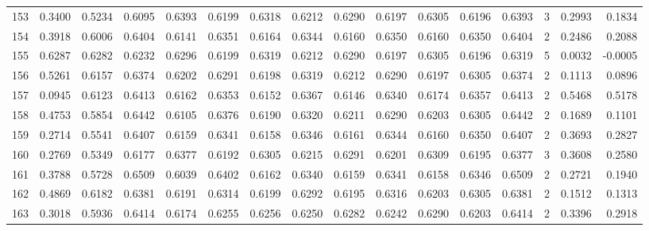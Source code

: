 \begin{tabular}{lrrrrrrrrrrrrrrr}
153 &      0.3400 &  0.5234 &  0.6095 &  0.6393 &  0.6199 &  0.6318 &  0.6212 &  0.6290 &  0.6197 &  0.6305 &   0.6196 &     0.6393 &      3 &                    0.2993 &                     0.1834 \\
154 &      0.3918 &  0.6006 &  0.6404 &  0.6141 &  0.6351 &  0.6164 &  0.6344 &  0.6160 &  0.6350 &  0.6160 &   0.6350 &     0.6404 &      2 &                    0.2486 &                     0.2088 \\
155 &      0.6287 &  0.6282 &  0.6232 &  0.6296 &  0.6199 &  0.6319 &  0.6212 &  0.6290 &  0.6197 &  0.6305 &   0.6196 &     0.6319 &      5 &                    0.0032 &                    -0.0005 \\
156 &      0.5261 &  0.6157 &  0.6374 &  0.6202 &  0.6291 &  0.6198 &  0.6319 &  0.6212 &  0.6290 &  0.6197 &   0.6305 &     0.6374 &      2 &                    0.1113 &                     0.0896 \\
157 &      0.0945 &  0.6123 &  0.6413 &  0.6162 &  0.6353 &  0.6152 &  0.6367 &  0.6146 &  0.6340 &  0.6174 &   0.6357 &     0.6413 &      2 &                    0.5468 &                     0.5178 \\
158 &      0.4753 &  0.5854 &  0.6442 &  0.6105 &  0.6376 &  0.6190 &  0.6320 &  0.6211 &  0.6290 &  0.6203 &   0.6305 &     0.6442 &      2 &                    0.1689 &                     0.1101 \\
159 &      0.2714 &  0.5541 &  0.6407 &  0.6159 &  0.6341 &  0.6158 &  0.6346 &  0.6161 &  0.6344 &  0.6160 &   0.6350 &     0.6407 &      2 &                    0.3693 &                     0.2827 \\
160 &      0.2769 &  0.5349 &  0.6177 &  0.6377 &  0.6192 &  0.6305 &  0.6215 &  0.6291 &  0.6201 &  0.6309 &   0.6195 &     0.6377 &      3 &                    0.3608 &                     0.2580 \\
161 &      0.3788 &  0.5728 &  0.6509 &  0.6039 &  0.6402 &  0.6162 &  0.6340 &  0.6159 &  0.6341 &  0.6158 &   0.6346 &     0.6509 &      2 &                    0.2721 &                     0.1940 \\
162 &      0.4869 &  0.6182 &  0.6381 &  0.6191 &  0.6314 &  0.6199 &  0.6292 &  0.6195 &  0.6316 &  0.6203 &   0.6305 &     0.6381 &      2 &                    0.1512 &                     0.1313 \\
163 &      0.3018 &  0.5936 &  0.6414 &  0.6174 &  0.6255 &  0.6256 &  0.6250 &  0.6282 &  0.6242 &  0.6290 &   0.6203 &     0.6414 &      2 &                    0.3396 &                     0.2918 \\

\end{tabular}
